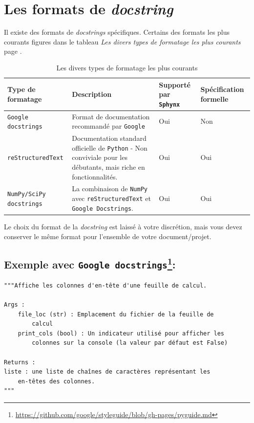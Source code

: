 \documentclass[a4paper,11pt]{book}
\begin{document}
\section{Les formats de \textit{docstring}}
Il existe des formats de \textit{docstrings} spécifiques. Certains des formats les plus courants figures dans le tableau \textit{Les divers types de formatage les plus courants} page \pageref{formatsdocstring}.
\begin{table}[h]
\begin{center}
\begin{tabular}{|p{3.7cm}|p{5cm}|p{2.3cm}|p{2.3cm}|}
\hline
\textbf{Type de formatage} & \textbf{Description} & \textbf{Supporté par \texttt{Sphynx}} & \textbf{Spécification formelle} \\
\hline
\texttt{Google docstrings} & Format de documentation recommandé par \texttt{Google} & Oui & Non \\
\hline
\texttt{reStructuredText} & Documentation standard officielle de \texttt{Python} - Non conviviale pour les débutants, mais riche en fonctionnalités. & Oui & Oui \\
\hline
\texttt{NumPy/SciPy docstrings} & La combinaison de \texttt{NumPy} avec \texttt{reStructuredText} et \texttt{Google Docstrings}. & Oui & Oui \\
\hline
\end{tabular}
\caption{Les divers types de formatage les plus courants}\label{formatsdocstring}
\end{center}
\end{table}
\medskip

Le choix du format de la \textit{docstring} est laissé à votre discrétion, mais vous devez conserver le même format pour l'ensemble de votre document/projet.
\medskip

\subsection*{Exemple avec \texttt{Google docstrings}\footnote{\url{https://github.com/google/styleguide/blob/gh-pages/pyguide.md}}:}
\begin{lstlisting}
"""Affiche les colonnes d'en-tête d'une feuille de calcul.

Args :
    file_loc (str) : Emplacement du fichier de la feuille de 
        calcul
    print_cols (bool) : Un indicateur utilisé pour afficher les 
    	colonnes sur la console (la valeur par défaut est False)

Returns :
liste : une liste de chaînes de caractères représentant les 
    en-têtes des colonnes.
"""
\end{lstlisting}
\medskip
\end{document}
